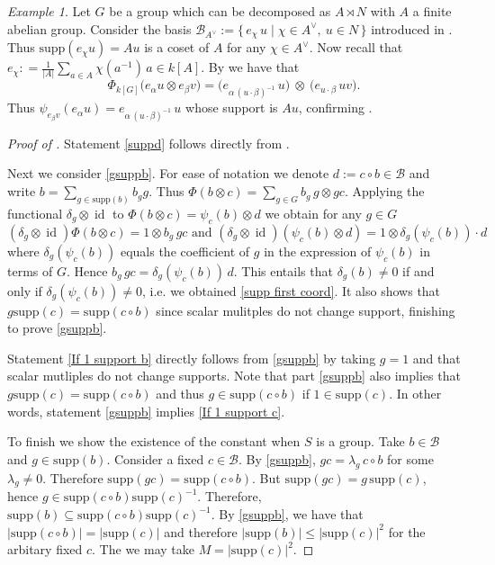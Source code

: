\documentclass[a4paper,10pt]{amsart}
\theoremstyle{definition}
\theoremstyle{remark}
\newtheorem{example}[lemma]{Example}
\DeclareMathOperator{\id}{id}
\newcommand{\Supp}{\mathrm{supp}}
\newcommand\ot{\otimes}
\newcommand\mc{\mathcal}
\begin{document}
\begin{example}
Let $G$ be a group which can be decomposed as $A \rtimes N$ with $A$ a finite abelian group. Consider the basis $\mathcal{B}_{A^\vee} := \{\, e_\chi\,u \mid \chi\in A^\vee,\ u\in N\,\}$ introduced in . Thus $\Supp(e_{\chi}u) = Au$ is a coset of $A$ for any $\chi \in A^{\vee}.$ Now recall that 
$e_{\chi} : = \frac{1}{|A|}\sum_{a\in A}\chi(a^{-1})\,a \in k[A].$ By  we have that
$$\Phi_{k[G]}\bigl(e_\alpha u\ot e_\beta v \bigr)
=
\bigl(e_{\alpha\,(u\cdot\beta)^{-1}}\,u\bigr)\ \ot\ \bigl(e_{u\cdot\beta}\,uv\bigr).$$
Thus $\psi_{e_\beta v}(e_\alpha u)= e_{\alpha\,(u\cdot\beta)^{-1}}\,u$ whose support is $Au$, confirming .
\end{example}

\begin{proof}[Proof of ]
Statement \eqref{suppd} follows directly from .  

Next we consider \eqref{gsuppb}. For ease of notation we denote $d:=c\circ b\in \mc{B}$ and write $b=\sum_{g\in \Supp(b)} b_g g$. Thus $\Phi(b\ot c)=\sum_{g\in G} b_g\, g\ot g c$. Applying the functional $\delta_g\ot \id$ to $\Phi(b\ot c)=\psi_c(b)\ot d$ we obtain for any $g \in G$
\[
(\delta_g\ot \id)\Phi(b\otimes c)= 1 \ot b_g\,gc \text{ and } (\delta_g\ot \id)(\psi_c(b)\ot d)= 1 \ot \delta_g(\psi_c(b))\cdot d
\]
where $\delta_g(\psi_c(b))$ equals the coefficient of $g$ in the expression of $\psi_c(b)$ in terms of $G$. Hence $b_g\,gc=\delta_g(\psi_c(b))\,d.$ This entails that $\delta_g(b) \neq 0$ if and only if  $\delta_g(\psi_c(b)) \neq 0$, i.e. we obtained \eqref{supp first coord}. It also shows that $g\Supp(c) = \Supp(c \circ b)$ since scalar mulitples do not change support, finishing to prove \eqref{gsuppb}.
 \smallskip

Statement \eqref{If 1 support b} directly follows from \eqref{gsuppb} by taking $g =1$ and that scalar mutliples do not change supports. Note that part \eqref{gsuppb} also implies that $g \Supp(c)  = \Supp(c \circ b)$ and thus $g \in \Supp(c\circ b)$ if $1 \in \Supp(c)$. In other words, statement \eqref{gsuppb} implies \eqref{If 1 support c}.

To finish we show the existence of the constant when $S$ is a group. Take $b \in \mc{B}$ and $g\in \Supp(b)$. Consider a fixed $c \in \mc{B}$. By \eqref{gsuppb}, $gc=\lambda_g \,  c \circ b$ for some $\lambda_g\neq 0$. Therefore $\Supp(gc)=\Supp(c\circ b)$. But $\Supp(gc)=g\,\Supp(c)$, hence $g\in \Supp(c \circ b)\Supp(c)^{-1}$. Therefore, $\Supp(b) \subseteq \Supp(c \circ b)\Supp(c)^{-1}$. By  \eqref{gsuppb}, we have that $|\Supp(c\circ b)|= |\Supp(c)|$ and therefore $|\Supp(b)| \leq |\Supp(c)|^2$ for the arbitary fixed $c$. The we may take $M = |\Supp(c)|^2$.
\end{proof}
\end{document}
